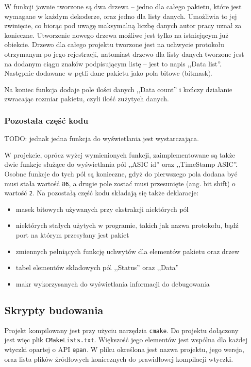 \documentclass[a4paper, 12pt, twoside, openright]{article}
\begin{document}
	W funkcji jawnie tworzone są dwa drzewa -- jedno dla całego pakietu, które jest wymagane w każdym dekoderze, oraz jedno
	dla listy danych. Umożliwia to jej zwinięcie, co biorąc pod uwagę maksymalną liczbę danych autor pracy uznał za konieczne.
	Utworzenie nowego drzewa możliwe jest tylko na istniejącym już obiekcie. Drzewo dla całego projektu
	tworzone jest na uchwycie protokołu otrzymanym po jego rejestracji, natomiast drzewo dla listy danych tworzone jest na dodanym
	ciągu znaków podpisującym listę -- jest to napis ,,Data list''. Następnie dodawane w pętli dane pakietu jako pola bitowe $($bitmask$)$.

	Na koniec funkcja dodaje pole ilości danych ,,Data count'' i kończy działanie zwracając rozmiar pakietu, czyli ilość zużytych danych.

	\subsubsection{Pozostała część kodu}
	TODO: jednak jedna funkcja do wyświetlania jest wystarczająca.

	W projekcie, oprócz wyżej wymienionych funkcji, zaimplementowane są także dwie funkcje służące do wyświetlania pól ,,ASIC id'' oraz ,,TimeStamp ASIC''.
	Osobne funkcje do tych pól są konieczne, gdyż do pierwszego pola dodana być musi stała wartość \texttt{86}, a drugie pole zostać musi przesunięte (ang. bit shift)
	o wartość \texttt{2}. Na pozostałą część kodu składają się także deklaracje:
	\begin{itemize}
		\item masek bitowych używanych przy ekstrakcji niektórych pól
		\item niektórych stałych użytych w programie, takich jak nazwa protokołu, bądź port na którym przesyłany jest pakiet
		\item zmiennych pełniących funkcję uchwytów dla elementów pakietu oraz drzew
		\item tabel elementów składowych pól ,,Status'' oraz ,,Data''
		\item makr wykorzysanych do wyświetlania informacji do debugowania
	\end{itemize}

	\subsection{Skrypty budowania}

	Projekt kompilowany jest przy użyciu narzędzia \texttt{cmake}. Do projektu dołączony jest więc plik \texttt{CMakeLists.txt}.
	Większość jego elementów jest wspólna dla każdej wtyczki opartej o API \texttt{epan}.
	W pliku określona jest nazwa projektu, jego wersja, oraz lista plików źródłowych koniecznych do prawidłowej kompilacji wtyczki.
\end{document}
